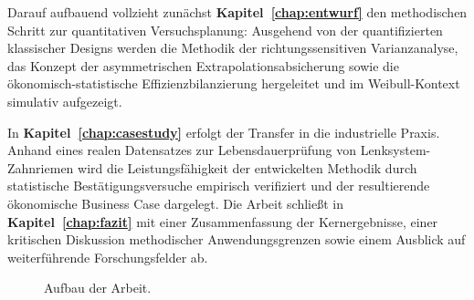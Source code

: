 Darauf aufbauend vollzieht zunächst \textbf{Kapitel~\ref{chap:entwurf}} den methodischen Schritt zur quantitativen Versuchsplanung: Ausgehend von der quantifizierten  klassischer Designs werden die Methodik der richtungssensitiven Varianzanalyse, das Konzept der asymmetrischen Extrapolationsabsicherung sowie die ökonomisch-statistische Effizienzbilanzierung hergeleitet und im Weibull-Kontext simulativ aufgezeigt.

In \textbf{Kapitel~\ref{chap:casestudy}} erfolgt der Transfer in die industrielle Praxis.
Anhand eines realen Datensatzes zur Lebensdauerprüfung von Lenksystem-Zahnriemen wird die Leistungsfähigkeit der entwickelten Methodik durch statistische Bestätigungsversuche empirisch verifiziert und der resultierende ökonomische Business Case dargelegt.
Die Arbeit schließt in \textbf{Kapitel~\ref{chap:fazit}} mit einer Zusammenfassung der Kernergebnisse, einer kritischen Diskussion methodischer Anwendungsgrenzen sowie einem Ausblick auf weiterführende Forschungsfelder ab.
\begin{figure}[htbp]
      \centering
      \def\svgwidth{0.9\textwidth}
      
      \caption{Aufbau der Arbeit.}
      \label{fig:aufbau}
\end{figure}